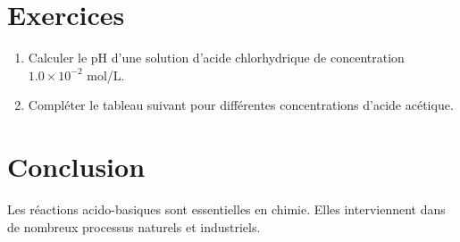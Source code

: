 \documentclass[12pt]{article}
\begin{document}
\section{Exercices}
\begin{enumerate}
\item Calculer le pH d'une solution d'acide chlorhydrique de concentration \(1.0 \times 10^{-2}\) mol/L.
\item Compléter le tableau suivant pour différentes concentrations d'acide acétique.
\end{enumerate}

\section{Conclusion}
Les réactions acido-basiques sont essentielles en chimie. Elles interviennent dans de nombreux processus naturels et industriels.
\end{document}
